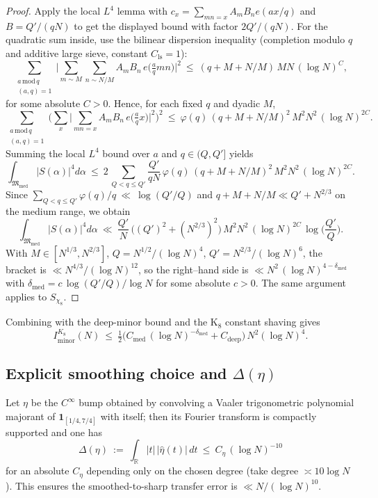 \documentclass[11pt]{article}
\theoremstyle{definition}
\theoremstyle{remark}
\begin{document}
\begin{proof}
Apply the local $L^4$ lemma with $c_x=\sum_{mn=x}A_mB_n e(a x/q)$ and $B=Q'/(qN)$ to get the displayed bound with factor $2Q'/(qN)$. For the quadratic sum inside, use the bilinear dispersion inequality (completion modulo $q$ and additive large sieve, constant $C_{\mathrm{ls}}=1$):
\[
\sum_{\substack{a\,\mathrm{mod}\,q\\(a,q)=1}}\Big|\sum_{m\sim M}\sum_{n\sim N/M} A_m B_n\,e\!\Big(\tfrac{a}{q}mn\Big)\Big|^2\ \le\ (q+M+N/M)\,MN\,(\log N)^C,
\]
for some absolute $C>0$. Hence, for each fixed $q$ and dyadic $M$,
\[
\sum_{\substack{a\,\mathrm{mod}\,q\\(a,q)=1}}\Big(\sum_x\Big|\sum_{mn=x} A_m B_n\,e\!\Big(\tfrac{a}{q}x\Big)\Big|^2\Big)^{\!2}\ \le\ \varphi(q)\,(q+M+N/M)^2\,M^2N^2\,(\log N)^{2C}.
\]
Summing the local $L^4$ bound over $a$ and $q\in(Q,Q']$ yields
\[
\int_{\mathfrak M_{\mathrm{med}}}\! |S(\alpha)|^4 d\alpha\ \le\ 2\,\sum_{Q<q\le Q'}\frac{Q'}{qN}\,\varphi(q)\,(q+M+N/M)^2\,M^2N^2\,(\log N)^{2C}.
\]
Since $\sum_{Q<q\le Q'} \varphi(q)/q\ \ll\ \log(Q'/Q)$ and $q+M+N/M\ll Q'+N^{2/3}$ on the medium range, we obtain
\[
\int_{\mathfrak M_{\mathrm{med}}}\! |S(\alpha)|^4 d\alpha\ \ll\ \frac{Q'}{N}\,\Big((Q')^2+(N^{2/3})^2\Big)\,M^2N^2\,(\log N)^{2C}\,\log\!\Big(\frac{Q'}{Q}\Big).
\]
With $M\in[N^{1/3},N^{2/3}]$, $Q=N^{1/2}/(\log N)^4$, $Q'=N^{2/3}/(\log N)^6$, the bracket is $\ll N^{4/3}/(\log N)^{12}$, so the right–hand side is $\ll N^2\,(\log N)^{4-\delta_{\mathrm{med}}}$ with $\delta_{\mathrm{med}}=c\,\log(Q'/Q)/\log N$ for some absolute $c>0$. The same argument applies to $S_{\chi_8}$.
\end{proof}

Combining with the deep-minor bound and the K$_8$ constant shaving gives
\[
I_{\mathrm{minor}}^{K_8}(N)\ \le\ \tfrac12\Big(C_{\mathrm{med}}\,(\log N)^{-\delta_{\mathrm{med}}}+C_{\mathrm{deep}}\Big)\,N^2(\log N)^4.
\]

\subsection*{Explicit smoothing choice and $\Delta(\eta)$}
Let $\eta$ be the $C^{\infty}$ bump obtained by convolving a Vaaler trigonometric polynomial majorant of $\mathbf 1_{[1/4,7/4]}$ with itself; then its Fourier transform is compactly supported and one has
\[
\Delta(\eta)\ :=\ \int_{\mathbb R} |t|\,|\widehat{\eta}(t)|\,dt\ \le\ C_{\eta}\,(\log N)^{-10}
\]
for an absolute $C_{\eta}$ depending only on the chosen degree (take degree $\asymp 10\log N$). This ensures the smoothed-to-sharp transfer error is $\ll N/(\log N)^{10}$.
\end{document}
